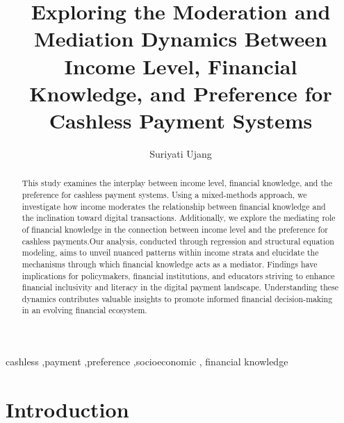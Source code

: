 \documentclass[
  super,
  preprint,
  3p]{elsarticle}
\begin{document}
\begin{frontmatter}
\title{Exploring the Moderation and Mediation Dynamics Between Income
Level, Financial Knowledge, and Preference for Cashless Payment Systems}
\author[1]{Suriyati Ujang%
%
}



        
\begin{abstract}
This study examines the interplay between income level, financial
knowledge, and the preference for cashless payment systems. Using a
mixed-methods approach, we investigate how income moderates the
relationship between financial knowledge and the inclination toward
digital transactions. Additionally, we explore the mediating role of
financial knowledge in the connection between income level and the
preference for cashless payments.Our analysis, conducted through
regression and structural equation modeling, aims to unveil nuanced
patterns within income strata and elucidate the mechanisms through which
financial knowledge acts as a mediator. Findings have implications for
policymakers, financial institutions, and educators striving to enhance
financial inclusivity and literacy in the digital payment landscape.
Understanding these dynamics contributes valuable insights to promote
informed financial decision-making in an evolving financial ecosystem.
\end{abstract}





\begin{keyword}
    cashless \sep payment \sep preference \sep socioeconomic \sep 
    financial knowledge
\end{keyword}
\end{frontmatter}
    \ifdefined\Shaded\renewenvironment{Shaded}{\begin{tcolorbox}[frame hidden, interior hidden, boxrule=0pt, borderline west={3pt}{0pt}{shadecolor}, sharp corners, breakable, enhanced]}{\end{tcolorbox}}\fi

\hypertarget{introduction}{%
\section{Introduction}\label{introduction}}
\end{document}
